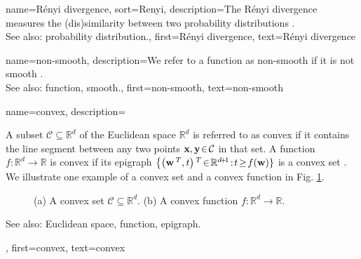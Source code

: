 {
{name={R\'enyi divergence}, 
sort={Renyi},
	description={The R\'enyi divergence measures the (dis)similarity 
		between two probability distributions \cite{RenyiInfo95}.
				\\
		See also: probability distribution.}, 
	first={R\'enyi divergence}, 
	text={R\'enyi divergence}
} 

{name={non-smooth},
	description={We refer to a function as non-smooth if it is not 
		smooth \cite{nesterov04}.
				\\
		See also: function, smooth.},
	first={non-smooth},
	text={non-smooth}
}

{name={convex},
	description={A subset $\mathcal{C} \subseteq \mathbb{R}^{d}$ of the 
		Euclidean space $\mathbb{R}^{d}$ is referred to as convex if it contains 
		the line segment between any two points ${\bf x}, {\bf y}\!\in\!\mathcal{C}$ in that set. A function  
		$f\!:\!\mathbb{R}^{d}\!\rightarrow\!\mathbb{R}$ 
		is convex if its epigraph $\big\{ \big( {\bf w}\,^{T},t \big)\,^{T}\!\in\!\mathbb{R}^{d\!+\!1}\!:\!t\!\geq\!f({\bf w}) \}$ 
		is a convex set \cite{BoydConvexBook}. We illustrate one example of a convex set 
		and a convex function in Fig. \ref{fig_convex_set_function_dict}. 
		\begin{figure}[H]
		\begin{center}
			\vspace*{-8mm}
			\end{center}
			\caption{(a) A convex set $\mathcal{C} \subseteq \mathbb{R}^{d}$. 
				(b) A convex function $f: \mathbb{R}^{d} \rightarrow \mathbb{R}$.\label{fig_convex_set_function_dict}}
		\end{figure}
		See also: Euclidean space, function, epigraph.},
	first={convex},
	text={convex}
}


}
